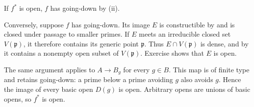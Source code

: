 If $f^*$ is open, $f$ has going-down by (ii).

Conversely, suppose $f$ has going-down. Its image $E$ is constructible by  and is closed under passage to smaller primes. If $E$ meets an irreducible closed set $V(\mathfrak{p})$, it therefore contains its generic point $\mathfrak{p}$. Thus $E\cap V(\mathfrak{p})$ is dense, and by  it contains a nonempty open subset of $V(\mathfrak{p})$. Exercise  shows that $E$ is open.

The same argument applies to $A\to B_g$ for every $g\in B$. This map is of finite type and retains going-down: a prime below a prime avoiding $g$ also avoids $g$. Hence the image of every basic open $D(g)$ is open. Arbitrary opens are unions of basic opens, so $f^*$ is open.

